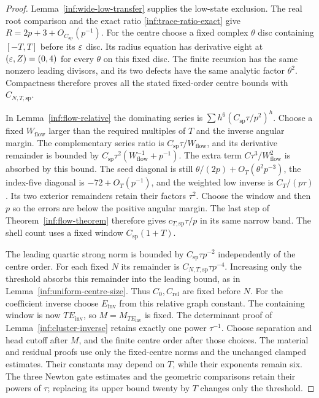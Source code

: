 \begin{proof}
Lemma~\ref{inf:wide-low-transfer} supplies the low-state exclusion.
The real root comparison and the exact ratio
\eqref{inf:trace-ratio-exact} give $R=2p+3+O_{C_{\mathrm{ap}}}(p^{-1})$.
For the centre choose a fixed complex $\theta$ disc containing
$[-T,T]$ before its $\varepsilon$ disc. Its radius equation has derivative
eight at $(\varepsilon,Z)=(0,4)$ for every $\theta$ on this fixed disc.
The finite recursion has the same nonzero leading divisors, and its
two defects have the same analytic factor $\theta^2$. Compactness
therefore proves all the stated fixed-order centre bounds with
$C_{N,T,\mathrm{sp}}$.

In Lemma~\ref{inf:flow-relative} the dominating series is
$\sum h^6(C_{\mathrm{sp}}\tau/p^2)^h$. Choose a fixed
$W_{\mathrm{flow}}$ larger than the required multiples of $T$ and
the inverse angular margin. The complementary series ratio is
$C_{\mathrm{sp}}\tau/W_{\mathrm{flow}}$, and its derivative remainder
is bounded by $C_{\mathrm{sp}}\tau^2(W_{\mathrm{flow}}^{-1}+p^{-1})$.
The extra term $C\tau^3/W_{\mathrm{flow}}^2$ is absorbed by this
bound. The seed diagonal is still
$\theta/(2p)+O_T(\theta^2p^{-3})$, the index-five diagonal is
$-72+O_T(p^{-1})$, and the weighted low inverse is $C_T/(p\tau)$.
Its two exterior remainders retain their factors $\tau^2$.
Choose the window and then $p$ so the errors are below the positive
angular margin. The last step of Theorem~\ref{inf:flow-theorem}
therefore gives $c_{T,\mathrm{sp}}\tau/p$ in its same narrow band.
The shell count uses a fixed window $C_{\mathrm{sp}}(1+T)$.

The leading quartic strong norm is bounded by
$C_{\mathrm{sp}}\tau p^{-2}$ independently of the centre order.
For each fixed $N$ its remainder is
$C_{N,T,\mathrm{sp}}\tau p^{-4}$. Increasing only the threshold
absorbs this remainder into the leading bound, as in
Lemma~\ref{inf:uniform-centre-size}. Thus $C_0,C_{\mathrm{rel}}$
are fixed before $N$. For the coefficient inverse choose
$E_{\mathrm{inv}}$ from this relative graph constant. The
containing window is now $TE_{\mathrm{inv}}$, so
$M=M_{TE_{\mathrm{inv}}}$ is fixed. The determinant proof of
Lemma~\ref{inf:cluster-inverse} retains exactly one power $\tau^{-1}$.
Choose separation and head cutoff after $M$, and the finite centre
order after those choices. The material and residual proofs use
only the fixed-centre norms and the unchanged clamped estimates.
Their constants may depend on $T$, while their exponents remain six.
The three Newton gate estimates and the geometric comparisons
retain their powers of $\tau$; replacing its upper bound twenty by
$T$ changes only the threshold.
\end{proof}

